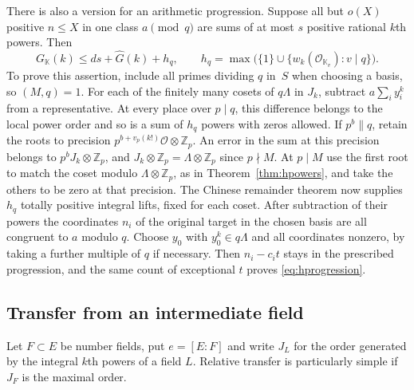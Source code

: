 \documentclass[11pt,letterpaper]{article}
\theoremstyle{definition}
\numberwithin{equation}{section}
\begin{document}
There is also a version for an arithmetic progression. Suppose all
but $o(X)$ positive $n\le X$ in one class $a\pmod q$ are sums of at
most $s$ positive rational $k$th powers. Then
\begin{equation}\label{eq:hprogression}
              G_{\mathbb K}(k)\le ds+\widehat G(k)+h_q,
 \qquad h_q=\max\bigl(\{1\}\cup
       \{w_k(\mathcal O_{\mathbb K_v}):v\mid q\}\bigr).
\end{equation}
To prove this assertion, include all primes dividing $q$ in~$S$
when choosing a basis, so $(M,q)=1$. For each of the finitely many
cosets of $q\Lambda$ in $J_k$, subtract $a\sum_i y_i^k$ from a
representative. At every place over $p\mid q$, this difference belongs
to the local power order and so is a sum of $h_q$ powers with zeros
allowed. If $p^b\parallel q$, retain the roots to precision
$p^{b+v_p(k!)}\mathcal O\otimes\mathbb Z_p$. An error in the sum
at this precision belongs to $p^b J_k\otimes\mathbb Z_p$, and
$J_k\otimes\mathbb Z_p=\Lambda\otimes\mathbb Z_p$ since $p\nmid M$.
At $p\mid M$ use the first root to match the coset modulo
$\Lambda\otimes\mathbb Z_p$, as in Theorem~\ref{thm:hpowers}, and
take the others to be zero at that precision. The Chinese remainder
theorem now supplies $h_q$ totally positive integral lifts, fixed
for each coset. After subtraction of their powers the coordinates
$n_i$ of the original target in the chosen basis are all congruent
to $a$ modulo $q$. Choose $y_0$ with $y_0^k\in q\Lambda$ and all
coordinates nonzero, by taking a further multiple of $q$ if necessary.
Then $n_i-c_i t$ stays in the prescribed progression, and the same
count of exceptional $t$ proves \eqref{eq:hprogression}.

\subsection{Transfer from an intermediate field}
Let $F\subset E$ be number fields, put $e=[E:F]$ and write
$J_L$ for the order generated by the integral $k$th powers of
a field $L$. Relative transfer is particularly simple if $J_F$
is the maximal order.
\end{document}
